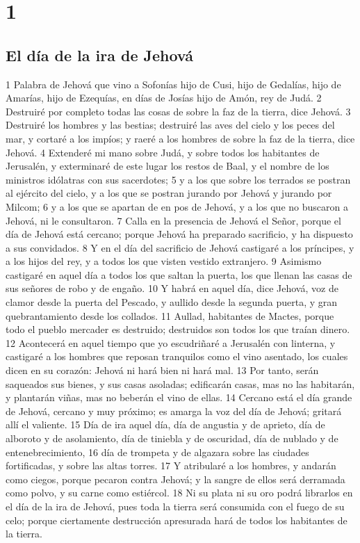 
\chapter{1}

\section*{El día de la ira de Jehová}

1 Palabra de Jehová que vino a Sofonías hijo de Cusi, hijo de Gedalías, hijo de Amarías, hijo de Ezequías, en días de Josías hijo de Amón, rey de Judá.
2 Destruiré por completo todas las cosas de sobre la faz de la tierra, dice Jehová.
3 Destruiré los hombres y las bestias; destruiré las aves del cielo y los peces del mar, y cortaré a los impíos; y raeré a los hombres de sobre la faz de la tierra, dice Jehová.
4 Extenderé mi mano sobre Judá, y sobre todos los habitantes de Jerusalén, y exterminaré de este lugar los restos de Baal, y el nombre de los ministros idólatras con sus sacerdotes;
5 y a los que sobre los terrados se postran al ejército del cielo, y a los que se postran jurando por Jehová y jurando por Milcom;
6 y a los que se apartan de en pos de Jehová, y a los que no buscaron a Jehová, ni le consultaron.
7 Calla en la presencia de Jehová el Señor, porque el día de Jehová está cercano; porque Jehová ha preparado sacrificio, y ha dispuesto a sus convidados.
8 Y en el día del sacrificio de Jehová castigaré a los príncipes, y a los hijos del rey, y a todos los que visten vestido extranjero.
9 Asimismo castigaré en aquel día a todos los que saltan la puerta, los que llenan las casas de sus señores de robo y de engaño.
10 Y habrá en aquel día, dice Jehová, voz de clamor desde la puerta del Pescado, y aullido desde la segunda puerta, y gran quebrantamiento desde los collados.
11 Aullad, habitantes de Mactes, porque todo el pueblo mercader es destruido; destruidos son todos los que traían dinero.
12 Acontecerá en aquel tiempo que yo escudriñaré a Jerusalén con linterna, y castigaré a los hombres que reposan tranquilos como el vino asentado, los cuales dicen en su corazón: Jehová ni hará bien ni hará mal. 
13 Por tanto, serán saqueados sus bienes, y sus casas asoladas; edificarán casas, mas no las habitarán, y plantarán viñas, mas no beberán el vino de ellas.
14 Cercano está el día grande de Jehová, cercano y muy próximo; es amarga la voz del día de Jehová; gritará allí el valiente.
15 Día de ira aquel día, día de angustia y de aprieto, día de alboroto y de asolamiento, día de tiniebla y de oscuridad, día de nublado y de entenebrecimiento,
16 día de trompeta y de algazara sobre las ciudades fortificadas, y sobre las altas torres.
17 Y atribularé a los hombres, y andarán como ciegos, porque pecaron contra Jehová; y la sangre de ellos será derramada como polvo, y su carne como estiércol.
18 Ni su plata ni su oro podrá librarlos en el día de la ira de Jehová, pues toda la tierra será consumida con el fuego de su celo; porque ciertamente destrucción apresurada hará de todos los habitantes de la tierra.

